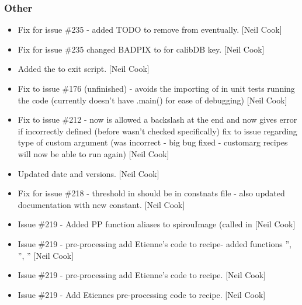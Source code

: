 \documentclass[a4paper,10pt,english]{report}
\begin{document}
\subsubsection{Other}
\label{\detokenize{misc/changelog:other}}\begin{itemize}
\item {} 
Fix for issue \#235 - added TODO to remove from  eventually.
{[}Neil Cook{]}

\item {} 
Fix for issue \#235 changed BADPIX to  for calibDB key. {[}Neil
Cook{]}

\item {} 
Added the  to exit script. {[}Neil Cook{]}

\item {} 
Fix to issue \#176 (unfinished) - avoids the importing of  in
unit tests running the code (currently doesn’t have .main() for ease
of debugging) {[}Neil Cook{]}

\item {} 
Fix to issue \#212 -  now is allowed a backslash at the end
and now gives error if incorrectly defined (before wasn’t checked
specifically) fix to issue regarding type of custom argument (was
incorrect - big bug fixed - customarg recipes will now be able to run
again) {[}Neil Cook{]}

\item {} 
Updated date and versions. {[}Neil Cook{]}

\item {} 
Fix for issue \#218 - threshold in  should be in
constnats file - also updated documentation with new constant. {[}Neil
Cook{]}

\item {} 
Issue \#219 - Added PP function aliases to spirouImage (called in
 {[}Neil Cook{]}

\item {} 
Issue \#219 - pre-processing add Etienne’s code to recipe- added
functions ”, ”,
” {[}Neil Cook{]}

\item {} 
Issue \#219 - pre-processing add Etienne’s code to recipe. {[}Neil Cook{]}

\item {} 
Issue \#219 - Add Etiennes pre-processing code to recipe. {[}Neil Cook{]}

\end{itemize}
\end{document}
